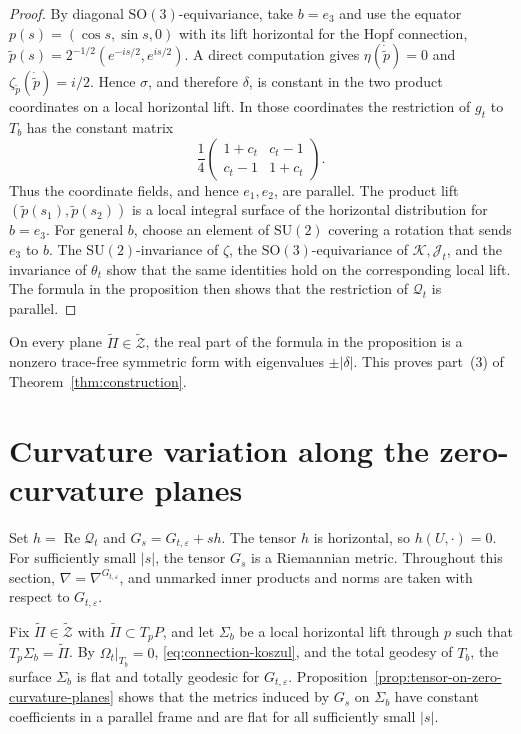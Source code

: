 \documentclass[11pt]{article}
\theoremstyle{definition}
\theoremstyle{remark}
\newcommand{\tZ}{\widetilde{\mathcal Z}}
\newcommand{\eps}{\varepsilon}
\begin{document}
\begin{proof}
By diagonal $\mathrm{SO}(3)$-equivariance, take $b=e_3$ and use the equator
$p(s)=(\cos s,\sin s,0)$ with its lift horizontal for the Hopf connection,
$\widetilde p(s)=2^{-1/2}(e^{-is/2},e^{is/2})$.
A direct computation gives
$\eta(\dot{\widetilde p})=0$ and
$\zeta_{\widetilde p}(\dot{\widetilde p})=i/2$.
Hence $\sigma$, and therefore $\delta$, is constant in the two product
coordinates on a local horizontal lift.  In those
coordinates the restriction of $g_t$ to $T_b$ has the constant matrix
\[
 \frac14
 \begin{pmatrix}
  1+c_t&c_t-1\\
  c_t-1&1+c_t
 \end{pmatrix}.
\]
Thus the coordinate fields, and hence $e_1,e_2$, are parallel.  The product
lift $(\widetilde p(s_1),\widetilde p(s_2))$ is a local integral surface of
the horizontal distribution for $b=e_3$.  For general $b$, choose an element
of $\mathrm{SU}(2)$ covering a
rotation that sends $e_3$ to $b$.  The $\mathrm{SU}(2)$-invariance of
$\zeta$, the $\mathrm{SO}(3)$-equivariance of $\mathscr K,\mathscr J_t$, and the
invariance of $\theta_t$ show that the same identities hold on the
corresponding local lift.  The formula in the proposition then shows that the restriction of
$\mathcal Q_t$ is parallel.
\end{proof}

On every plane $\widetilde\Pi\in\tZ$, the real part of the formula in the proposition is a
nonzero trace-free symmetric form with eigenvalues
$\pm|\delta|$.
This proves part~(3) of Theorem~\ref{thm:construction}.

\section{Curvature variation along the zero-curvature planes}                      \label{sec:perturbation}

Set $h=\operatorname{Re}\mathcal Q_t$ and $G_s=G_{t,\eps}+s h$.
The tensor $h$ is horizontal, so $h(U,\cdot)=0$.  For sufficiently small
$|s|$, the tensor $G_s$ is a Riemannian metric.
Throughout this section, $\nabla=\nabla^{G_{t,\eps}}$, and unmarked inner
products and norms are taken with respect to $G_{t,\eps}$.

Fix $\widetilde\Pi\in\tZ$ with $\widetilde\Pi\subset T_pP$, and let
$\Sigma_b$ be a local horizontal lift through $p$ such that
$T_p\Sigma_b=\widetilde\Pi$.  By
$\Omega_t|_{T_b}=0$, \eqref{eq:connection-koszul}, and the
total geodesy of $T_b$, the surface $\Sigma_b$ is flat and totally
geodesic for $G_{t,\eps}$.
Proposition~\ref{prop:tensor-on-zero-curvature-planes}
shows that the metrics induced by $G_s$ on $\Sigma_b$ have constant
coefficients in a parallel frame and are flat for all sufficiently small
$|s|$.
\end{document}
